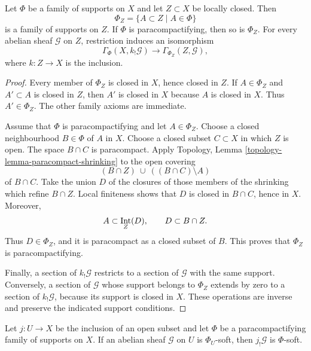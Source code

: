 \begin{lemma}
\label{lemma-induced-family-supports}
\begin{reference}
\cite[Chapter III, \S 3.5, p. 166]{Tohoku}
\end{reference}
Let $\Phi$ be a family of supports on $X$ and let $Z\subset X$ be locally
closed. Then
$$
\Phi_Z=\{A\subset Z\mid A\in\Phi\}
$$
is a family of supports on $Z$. If $\Phi$ is paracompactifying, then so
is $\Phi_Z$. For every abelian sheaf $\mathcal{G}$ on $Z$, restriction
induces an isomorphism
$$
\Gamma_\Phi(X,k_!\mathcal{G})
\longrightarrow \Gamma_{\Phi_Z}(Z,\mathcal{G}),
$$
where $k:Z\to X$ is the inclusion.
\end{lemma}

\begin{proof}
Every member of $\Phi_Z$ is closed in $X$, hence closed in $Z$. If
$A\in\Phi_Z$ and $A'\subset A$ is closed in $Z$, then $A'$ is closed in
$X$ because $A$ is closed in $X$. Thus $A'\in\Phi_Z$. The other family
axioms are immediate.

Assume that $\Phi$ is paracompactifying and let $A\in\Phi_Z$. Choose a
closed neighbourhood $B\in\Phi$ of $A$ in $X$. Choose a closed subset
$C\subset X$ in which $Z$ is open. The space $B\cap C$ is paracompact.
Apply Topology, Lemma \ref{topology-lemma-paracompact-shrinking} to the
open covering
$$
(B\cap Z)\ \cup\ ((B\cap C)\setminus A)
$$
of $B\cap C$. Take the union $D$ of the closures of those members of the
shrinking which refine $B\cap Z$. Local finiteness shows that $D$ is
closed in $B\cap C$, hence in $X$. Moreover,
$$
A\subset \mathop{\rm Int}_Z(D),\qquad D\subset B\cap Z.
$$
Thus $D\in\Phi_Z$, and it is paracompact as a closed subset of $B$. This
proves that $\Phi_Z$ is paracompactifying.

Finally, a section of $k_!\mathcal{G}$ restricts to a section of
$\mathcal{G}$ with the same support. Conversely, a section of
$\mathcal{G}$ whose support belongs to $\Phi_Z$ extends by zero to a
section of $k_!\mathcal{G}$, because its support is closed in $X$. These
operations are inverse and preserve the indicated support conditions.
\end{proof}

\begin{lemma}
\label{lemma-open-extension-phi-soft}
Let $j:U\to X$ be the inclusion of an open subset and let $\Phi$ be a
paracompactifying family of supports on $X$. If an abelian sheaf
$\mathcal{G}$ on $U$ is $\Phi_U$-soft, then $j_!\mathcal{G}$ is
$\Phi$-soft.
\end{lemma}

